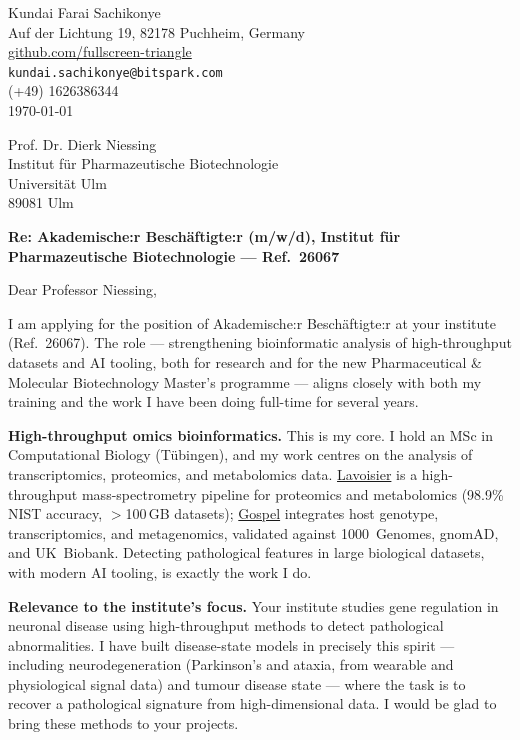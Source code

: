 \documentclass[12pt,a4paper]{article}
\begin{document}
\begin{flushright}
Kundai Farai Sachikonye \\
Auf der Lichtung 19, 82178 Puchheim, Germany \\
\href{https://github.com/fullscreen-triangle}{github.com/fullscreen-triangle} \\
\texttt{kundai.sachikonye@bitspark.com} \\
(+49) 1626386344 \\[6pt]
\today
\end{flushright}

\vspace{1em}

Prof. Dr. Dierk Niessing \\
Institut für Pharmazeutische Biotechnologie \\
Universität Ulm \\
89081 Ulm

\vspace{1.5em}

\textbf{Re: Akademische:r Beschäftigte:r (m/w/d), Institut für Pharmazeutische
Biotechnologie --- Ref.\ 26067}

\vspace{1em}

Dear Professor Niessing,

I am applying for the position of Akademische:r Beschäftigte:r at your institute
(Ref.\ 26067). The role --- strengthening bioinformatic analysis of
high-throughput datasets and AI tooling, both for research and for the new
Pharmaceutical \& Molecular Biotechnology Master's programme --- aligns closely
with both my training and the work I have been doing full-time for several years.

\textbf{High-throughput omics bioinformatics.}
This is my core. I hold an MSc in Computational Biology (Tübingen), and my work
centres on the analysis of transcriptomics, proteomics, and metabolomics data.
\href{https://github.com/fullscreen-triangle/lavoisier}{Lavoisier} is a
high-throughput mass-spectrometry pipeline for proteomics and metabolomics
(98.9\% NIST accuracy, $>$100\,GB datasets);
\href{https://github.com/fullscreen-triangle/gospel}{Gospel} integrates host
genotype, transcriptomics, and metagenomics, validated against 1000~Genomes,
gnomAD, and UK~Biobank. Detecting pathological features in large biological
datasets, with modern AI tooling, is exactly the work I do.

\textbf{Relevance to the institute's focus.}
Your institute studies gene regulation in neuronal disease using high-throughput
methods to detect pathological abnormalities. I have built disease-state models
in precisely this spirit --- including neurodegeneration (Parkinson's and ataxia,
from wearable and physiological signal data) and tumour disease state --- where
the task is to recover a pathological signature from high-dimensional data. I
would be glad to bring these methods to your projects.
\end{document}
